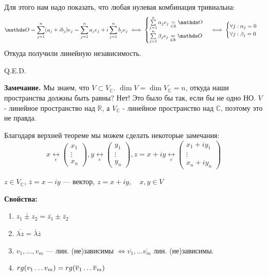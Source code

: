 Для этого нам надо показать, что любая нулевая комбинация тривиальна:
$$\zero = \sum\limits_{j=1}^n(a_j+ib_j)e_j = \sum\limits_{j=1}^na_je_j + i\sum\limits_{j=1}^nb_je_j \iff \begin{cases}
    \sum\limits_{j=1}^n \alpha_je_j\underset{\in \mathbb{R}} = \zero \\
     \sum\limits_{j=1}^n \beta_je_j\underset{\in \mathbb{R}} =\zero
\end{cases} \iff  \begin{cases}
     \forall j : \alpha_j =0 \\
    \forall j : \beta_j =0
\end{cases}$$ 
Откуда получили линейную независимость.

\hfill Q.E.D.

\textbf{Замечание.} Мы знаем, что $V \subset V_{\mathbb{C}}$. $\dim V = \dim V_{\mathbb{C}} = n$, откуда наши пространства должны быть равны? Нет! Это было бы так, если бы не одно НО.  $V$ - линейное пространство над $\mathbb{R}$, а $V_{\mathbb{C}}$ - линейное пространство над $\mathbb{C}$, поэтому это не правда.


Благодаря верхней теореме мы можем сделать некоторые замечания:
$$x \underset{e} \leftrightarrow \begin{pmatrix}
    x_1\\
    \vdots \\
    x_n
\end{pmatrix},y \underset{e} \leftrightarrow \begin{pmatrix}
    y_1\\
    \vdots \\
    y_n
\end{pmatrix}, z=x+iy \underset{e} \leftrightarrow \begin{pmatrix}
    x_1 +iy_1\\
    \vdots \\
    x_n+iy_n
\end{pmatrix}$$


 $z \in V_{\mathbb{C}}$, $\overline{z}=x-iy$ ---  вектор, $z=x+iy, \quad x,y \in V$

\textbf{Свойства:}
\begin{enumerate}
    \item $\overline{z_1 \pm z_2} = \overline{z_1}  \pm \overline{z_2}$
    \item $\overline{\lambda z} = \overline{\lambda} \overline{z}$
    \item$v_1,\ldots,v_m$ --- лин. (не)зависимы $\Leftrightarrow \overline{v_1}, \ldots \overline{v_m}$ лин. (не)зависимы.
    \item $rg (v_1\dots v_m) = rg (\overline{v}_1\dots \overline{v}_m)$
\end{enumerate}

